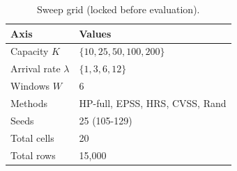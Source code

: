 \begin{table}[!t]
 \caption{Sweep grid (locked before evaluation).}
 \label{tab:grid}
 \centering
 \small
 \setlength{\tabcolsep}{4pt}
 \begin{tabular}{@{}p{3.0cm}p{4.7cm}@{}}
 \toprule
 \textbf{Axis} & \textbf{Values} \\
 \midrule
 Capacity $K$ & $\{10, 25, 50, 100, 200\}$ \\
 Arrival rate $\lambda$ & $\{1, 3, 6, 12\}$ \\
 Windows $W$ & 6 \\
 Methods & HP-full, EPSS, HRS, CVSS, Rand \\
 Seeds & 25 (105-129) \\
 \midrule
 Total cells & 20 \\
 Total rows & 15{,}000 \\
 \bottomrule
 \end{tabular}
\end{table}
